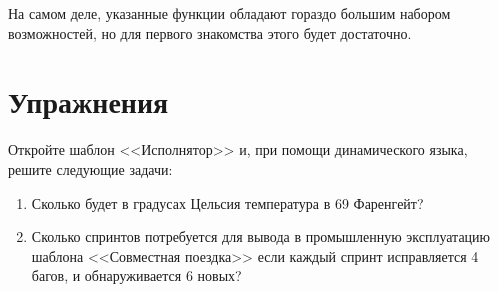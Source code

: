 \documentclass[../index.tex]{subfiles}
\begin{document}
    На самом деле, указанные функции обладают гораздо большим набором возможностей, но для первого знакомства этого будет достаточно. 
                
    \section{Упражнения}
    
    Откройте шаблон <<Исполнятор>> и, при помощи динамического языка, решите следующие задачи:
    
    \begin{enumerate}
        \item Сколько будет в градусах Цельсия температура в 69 Фаренгейт?
        
        \item Сколько спринтов потребуется для вывода в промышленную эксплуатацию шаблона <<Совместная поездка>> если каждый спринт исправляется 4 багов, и обнаруживается 6 новых?
    \end{enumerate}
\end{document}
